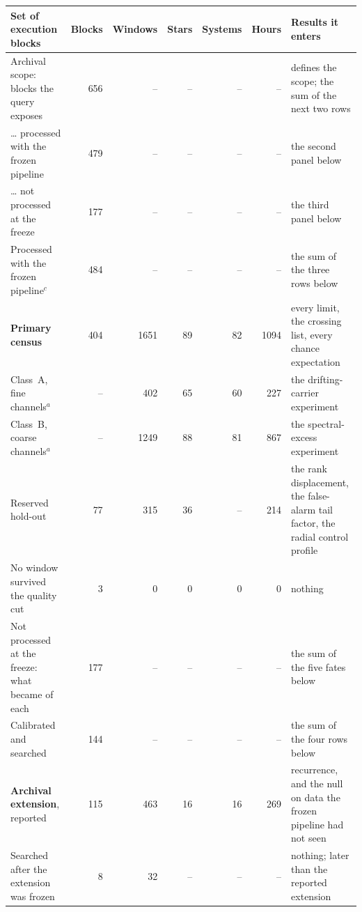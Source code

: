 \begin{tabular}{@{}p{}rrrrrp{}@{}}
\hline
Set of execution blocks & Blocks & Windows & Stars & Systems & Hours & Results it enters \\
\hline
Archival scope: blocks the query exposes & 656 & -- & -- & -- & -- & defines the scope; the sum of the next two rows \\
\hspace{1.1em}\ldots{} processed with the frozen pipeline & 479 & -- & -- & -- & -- & the second panel below \\
\hspace{1.1em}\ldots{} not processed at the freeze & 177 & -- & -- & -- & -- & the third panel below \\
\hline
Processed with the frozen pipeline$^{c}$ & 484 & -- & -- & -- & -- & the sum of the three rows below \\
\hspace{1.1em}\textbf{Primary census} & 404 & 1651 & 89 & 82 & 1094 & every limit, the crossing list, every chance expectation \\
\hspace{2.2em}Class~A, fine channels$^{a}$ & -- & 402 & 65 & 60 & 227 & the drifting-carrier experiment \\
\hspace{2.2em}Class~B, coarse channels$^{a}$ & -- & 1249 & 88 & 81 & 867 & the spectral-excess experiment \\
\hspace{1.1em}Reserved hold-out & 77 & 315 & 36 & -- & 214 & the rank displacement, the false-alarm tail factor, the radial control profile \\
\hspace{1.1em}No window survived the quality cut & 3 & 0 & 0 & 0 & 0 & nothing \\
\hline
Not processed at the freeze: what became of each & 177 & -- & -- & -- & -- & the sum of the five fates below \\
\hspace{1.1em}Calibrated and searched & 144 & -- & -- & -- & -- & the sum of the four rows below \\
\hspace{2.2em}\textbf{Archival extension}, reported & 115 & 463 & 16 & 16 & 269 & recurrence, and the null on data the frozen pipeline had not seen \\
\hspace{2.2em}Searched after the extension was frozen & 8 & 32 & -- & -- & -- & nothing; later than the reported extension \\

\end{tabular}
